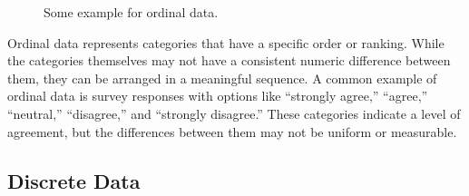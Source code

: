 \documentclass[
  a4paper,
]{scrbook}
\begin{document}
\begin{figure}[ht]


\caption{\label{fig-ordinaldata}Some example for ordinal data.}

\end{figure}%

Ordinal data represents categories that have a specific order or
ranking. While the categories themselves may not have a consistent
numeric difference between them, they can be arranged in a meaningful
sequence. A common example of ordinal data is survey responses with
options like ``strongly agree,'' ``agree,'' ``neutral,'' ``disagree,''
and ``strongly disagree.'' These categories indicate a level of
agreement, but the differences between them may not be uniform or
measurable.

\subsection{Discrete Data}\label{discrete-data}
\end{document}
